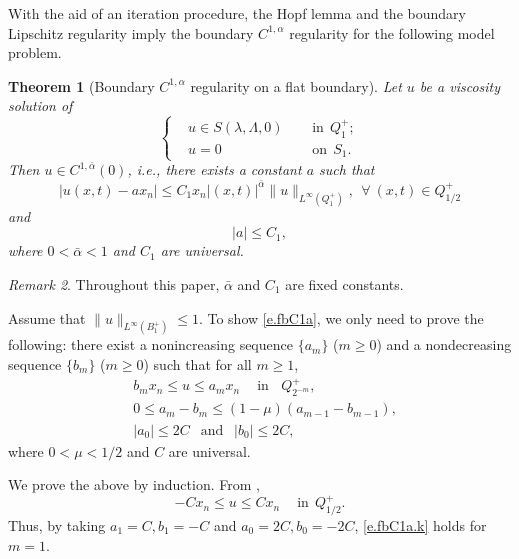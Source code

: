 \documentclass[preprint,12pt]{elsarticle}
\newtheorem{theorem}{Theorem}[section]
\theoremstyle{definition}
\theoremstyle{remark}
\newtheorem{remark}[theorem]{Remark}
\numberwithin{equation}{section}
\begin{document}
With the aid of an iteration procedure, the Hopf lemma and the boundary Lipschitz regularity imply the boundary $C^{1,\alpha}$ regularity for the following model problem.
\begin{theorem}[Boundary $C^{1,\alpha}$ regularity on a flat boundary]\label{Th1C1aF}
  Let $u$ be a viscosity solution of
  \begin{equation}\label{model1}
\left\{\begin{aligned}
&u\in S(\lambda,\Lambda,0)&& ~~\mbox{in}~~Q_1^+;\\
&u=0&& ~~\mbox{on}~~S_1.
\end{aligned}\right.
\end{equation}
Then $u\in C^{1,\bar{\alpha}}(0)$, i.e., there exists a constant $a$ such that
\begin{equation}\label{e.fbC1a}
|u(x,t)-ax_n|\leq C_1 x_n|(x,t)|^{\bar{\alpha}}\|u\|_{L^{\infty}(Q_1^+)},~~\forall~(x,t)\in Q^+_{1/2}
\end{equation}
and
\begin{equation*}
  |a|\leq C_1,
\end{equation*}
where $0<\bar{\alpha}<1$ and $C_1$ are universal.
\end{theorem}

\begin{remark}\label{re.xa1}
Throughout this paper, $\bar{\alpha}$ and $C_1$ are fixed constants.
\end{remark}

\proof Assume that $\|u\|_{L^{\infty}(B_1^+)}\leq 1$. To show \cref{e.fbC1a}, we only need to prove the following: there exist a nonincreasing sequence $\{a_m\}$ ($m\geq 0$) and a nondecreasing sequence $\{b_m\}$ ($m\geq 0$) such that for all $m\geq 1$,
\begin{equation}\label{e.fbC1a.k}
\begin{aligned}
  &b_mx_n\leq u\leq a_mx_n~~~~\mbox{   in}~~~~Q^+_{2^{-m}},\\
  &0\leq a_m-b_m\leq (1-\mu)(a_{m-1}-b_{m-1}),\\
  &|a_0|\leq 2C~~\mbox{ and }~~|b_0|\leq 2C,
\end{aligned}
\end{equation}
where $0<\mu<1/2$ and $C$ are universal.

We prove the above by induction. From ,
\begin{equation*}
  -Cx_n\leq u \leq Cx_n~~~~\mbox{ in}~~Q^+_{1/2}.
\end{equation*}
Thus, by taking $a_1=C, b_1=-C$ and $a_0=2C, b_0=-2C$, \cref{e.fbC1a.k} holds for $m=1$.
\end{document}
